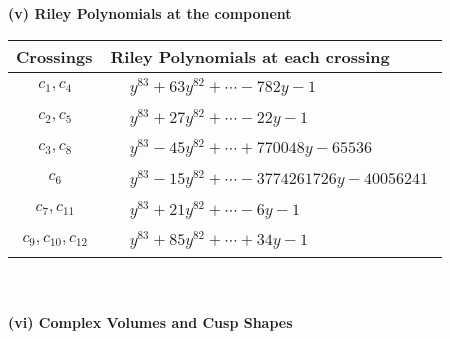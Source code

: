 \documentclass[1p]{elsarticle_modified}
\theoremstyle{definition}
\begin{document}
\newpage\renewcommand{\arraystretch}{1}
\flushleft \textbf{(v) Riley Polynomials at the component}\newline \\
\begin{tabular}{m{50pt}|m{274pt}}
Crossings & \hspace{64pt}Riley Polynomials at each crossing \\
\hline $$\begin{aligned}c_{1},c_{4}\end{aligned}$$&$\begin{aligned}
&y^{83}+63 y^{82}+\cdots-782 y-1
\end{aligned}$\\
\hline $$\begin{aligned}c_{2},c_{5}\end{aligned}$$&$\begin{aligned}
&y^{83}+27 y^{82}+\cdots-22 y-1
\end{aligned}$\\
\hline $$\begin{aligned}c_{3},c_{8}\end{aligned}$$&$\begin{aligned}
&y^{83}-45 y^{82}+\cdots+770048 y-65536
\end{aligned}$\\
\hline $$\begin{aligned}c_{6}\end{aligned}$$&$\begin{aligned}
&y^{83}-15 y^{82}+\cdots-3774261726 y-40056241
\end{aligned}$\\
\hline $$\begin{aligned}c_{7},c_{11}\end{aligned}$$&$\begin{aligned}
&y^{83}+21 y^{82}+\cdots-6 y-1
\end{aligned}$\\
\hline $$\begin{aligned}c_{9},c_{10},c_{12}\end{aligned}$$&$\begin{aligned}
&y^{83}+85 y^{82}+\cdots+34 y-1
\end{aligned}$\\
\hline
\end{tabular}\\~\\
\newpage\flushleft \textbf{(vi) Complex Volumes and Cusp Shapes}
\end{document}
